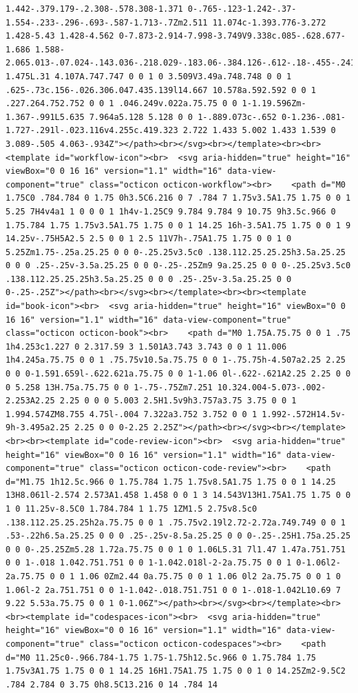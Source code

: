 \documentclass[
  letterpaper,
]{book}
\begin{document}
\begin{verbatim}
1.442-.379.179-.2.308-.578.308-1.371 0-.765-.123-1.242-.37-1.554-.233-.296-.693-.587-1.713-.7Zm2.511 11.074c-1.393.776-3.272 1.428-5.43 1.428-4.562 0-7.873-2.914-7.998-3.749V9.338c.085-.628.677-1.686 1.588-2.065.013-.07.024-.143.036-.218.029-.183.06-.384.126-.612-.18-.455-.241-.963-.252-1.475L.31 4.107A.747.747 0 0 1 0 3.509V3.49a.748.748 0 0 1 .625-.73c.156-.026.306.047.435.139l14.667 10.578a.592.592 0 0 1 .227.264.752.752 0 0 1 .046.249v.022a.75.75 0 0 1-1.19.596Zm-1.367-.991L5.635 7.964a5.128 5.128 0 0 1-.889.073c-.652 0-1.236-.081-1.727-.291l-.023.116v4.255c.419.323 2.722 1.433 5.002 1.433 1.539 0 3.089-.505 4.063-.934Z"></path><br></svg><br></template><br><br><template id="workflow-icon"><br>  <svg aria-hidden="true" height="16" viewBox="0 0 16 16" version="1.1" width="16" data-view-component="true" class="octicon octicon-workflow"><br>    <path d="M0 1.75C0 .784.784 0 1.75 0h3.5C6.216 0 7 .784 7 1.75v3.5A1.75 1.75 0 0 1 5.25 7H4v4a1 1 0 0 0 1 1h4v-1.25C9 9.784 9.784 9 10.75 9h3.5c.966 0 1.75.784 1.75 1.75v3.5A1.75 1.75 0 0 1 14.25 16h-3.5A1.75 1.75 0 0 1 9 14.25v-.75H5A2.5 2.5 0 0 1 2.5 11V7h-.75A1.75 1.75 0 0 1 0 5.25Zm1.75-.25a.25.25 0 0 0-.25.25v3.5c0 .138.112.25.25.25h3.5a.25.25 0 0 0 .25-.25v-3.5a.25.25 0 0 0-.25-.25Zm9 9a.25.25 0 0 0-.25.25v3.5c0 .138.112.25.25.25h3.5a.25.25 0 0 0 .25-.25v-3.5a.25.25 0 0 0-.25-.25Z"></path><br></svg><br></template><br><br><template id="book-icon"><br>  <svg aria-hidden="true" height="16" viewBox="0 0 16 16" version="1.1" width="16" data-view-component="true" class="octicon octicon-book"><br>    <path d="M0 1.75A.75.75 0 0 1 .75 1h4.253c1.227 0 2.317.59 3 1.501A3.743 3.743 0 0 1 11.006 1h4.245a.75.75 0 0 1 .75.75v10.5a.75.75 0 0 1-.75.75h-4.507a2.25 2.25 0 0 0-1.591.659l-.622.621a.75.75 0 0 1-1.06 0l-.622-.621A2.25 2.25 0 0 0 5.258 13H.75a.75.75 0 0 1-.75-.75Zm7.251 10.324.004-5.073-.002-2.253A2.25 2.25 0 0 0 5.003 2.5H1.5v9h3.757a3.75 3.75 0 0 1 1.994.574ZM8.755 4.75l-.004 7.322a3.752 3.752 0 0 1 1.992-.572H14.5v-9h-3.495a2.25 2.25 0 0 0-2.25 2.25Z"></path><br></svg><br></template><br><br><template id="code-review-icon"><br>  <svg aria-hidden="true" height="16" viewBox="0 0 16 16" version="1.1" width="16" data-view-component="true" class="octicon octicon-code-review"><br>    <path d="M1.75 1h12.5c.966 0 1.75.784 1.75 1.75v8.5A1.75 1.75 0 0 1 14.25 13H8.061l-2.574 2.573A1.458 1.458 0 0 1 3 14.543V13H1.75A1.75 1.75 0 0 1 0 11.25v-8.5C0 1.784.784 1 1.75 1ZM1.5 2.75v8.5c0 .138.112.25.25.25h2a.75.75 0 0 1 .75.75v2.19l2.72-2.72a.749.749 0 0 1 .53-.22h6.5a.25.25 0 0 0 .25-.25v-8.5a.25.25 0 0 0-.25-.25H1.75a.25.25 0 0 0-.25.25Zm5.28 1.72a.75.75 0 0 1 0 1.06L5.31 7l1.47 1.47a.751.751 0 0 1-.018 1.042.751.751 0 0 1-1.042.018l-2-2a.75.75 0 0 1 0-1.06l2-2a.75.75 0 0 1 1.06 0Zm2.44 0a.75.75 0 0 1 1.06 0l2 2a.75.75 0 0 1 0 1.06l-2 2a.751.751 0 0 1-1.042-.018.751.751 0 0 1-.018-1.042L10.69 7 9.22 5.53a.75.75 0 0 1 0-1.06Z"></path><br></svg><br></template><br><br><template id="codespaces-icon"><br>  <svg aria-hidden="true" height="16" viewBox="0 0 16 16" version="1.1" width="16" data-view-component="true" class="octicon octicon-codespaces"><br>    <path d="M0 11.25c0-.966.784-1.75 1.75-1.75h12.5c.966 0 1.75.784 1.75 1.75v3A1.75 1.75 0 0 1 14.25 16H1.75A1.75 1.75 0 0 1 0 14.25Zm2-9.5C2 .784 2.784 0 3.75 0h8.5C13.216 0 14 .784 14 
\end{verbatim}
\end{document}
